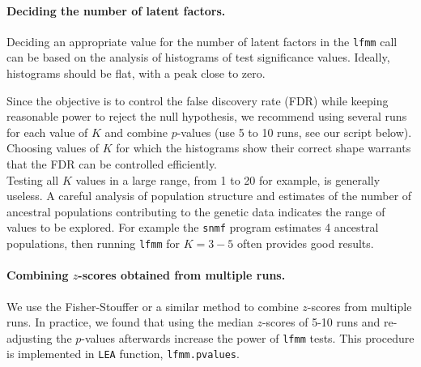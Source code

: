 \documentclass[12pt,a4paper,oneside]{article}\usepackage[]{graphicx}\usepackage[]{color}
\begin{document}
\paragraph{Deciding the number of latent factors.} Deciding an appropriate value for the number of latent factors in the {\tt lfmm} call can be based on the analysis of histograms of test significance values. Ideally, histograms should be flat, with a peak close to zero.

Since the objective is to control the false discovery rate (FDR) while keeping reasonable power to reject the null hypothesis, we recommend using several runs for each value of $K$ and combine $p$-values (use 5 to 10 runs, see our script below).  Choosing values of $K$ for which the histograms show their correct shape warrants that the FDR can be controlled efficiently.\\


Testing all $K$ values in a large range, from 1 to 20 for example, is generally useless. A careful analysis of population structure and estimates of the number of ancestral populations contributing to the genetic data indicates the range of values to be explored. For example the {\tt snmf} program estimates 4 ancestral populations, then running {\tt lfmm} for $K = 3-5$ often provides good results.


\paragraph{Combining $z$-scores obtained from multiple runs.}  We use the Fisher-Stouffer or a similar method to combine $z$-scores from multiple runs. In practice, we found that using the median $z$-scores of 5-10 runs and re-adjusting the $p$-values afterwards increase the power of {\tt lfmm} tests. This procedure is implemented in {\tt LEA} function, {\tt lfmm.pvalues}.
\end{document}
